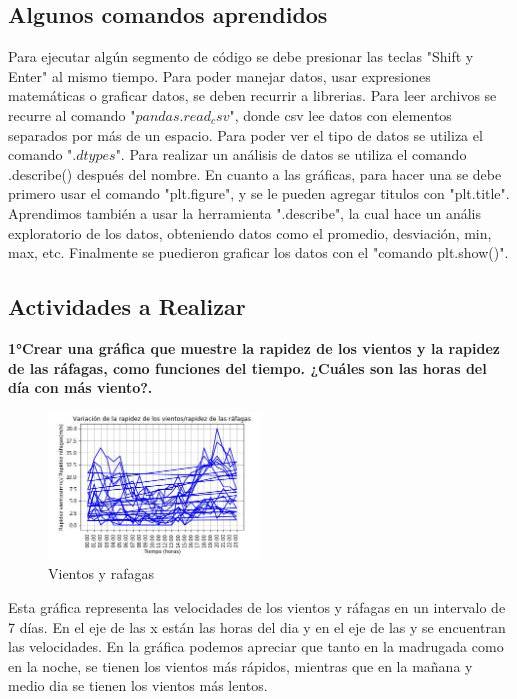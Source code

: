 \documentclass[a4paper]{article}
\begin{document}
\subsection{Algunos comandos aprendidos}
Para ejecutar algún segmento de código se debe presionar las teclas "Shift y Enter" al mismo tiempo. 
Para poder manejar datos, usar expresiones matemáticas o graficar datos, se deben recurrir a librerias. 
Para leer archivos se recurre al comando "$pandas.read_csv$", donde csv lee datos con elementos separados por más de un espacio. 
Para poder ver el tipo de datos se utiliza el comando "$.dtypes$". Para realizar un análisis de datos se utiliza el comando .describe() después del nombre. En cuanto a las gráficas, para hacer una se debe primero usar el comando "plt.figure", y se le pueden agregar titulos con "plt.title". Aprendimos también a usar la herramienta ".describe", la cual hace un anális exploratorio de los datos, obteniendo datos como el promedio, desviación, min, max, etc. Finalmente se puedieron graficar los datos con el "comando plt.show()". 


\newpage
\subsection{Actividades a Realizar}
\textbf{1°Crear una gráfica que muestre la rapidez de los vientos y la rapidez de las ráfagas, como funciones del tiempo. ¿Cuáles son las horas del día con más viento?.}

\begin{figure}[ht!]
\centering
\includegraphics[width=0.5\textwidth]{Grafica_vientos_y_rafagas.JPG}
\caption{\label{fig:Vientos y rafagas }Vientos y rafagas}
\end{figure}

Esta gráfica representa las velocidades de los vientos y ráfagas en un intervalo de 7 días. En el eje de las x están las horas del dia y en el eje de las y se encuentran las velocidades. 
En la gráfica podemos apreciar que tanto en la madrugada como en la noche, se tienen los vientos más rápidos, mientras que en la mañana y medio dia se tienen los vientos más lentos.\\
\end{document}
